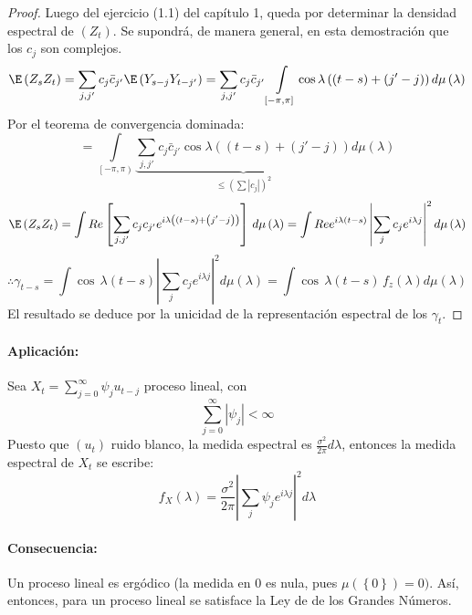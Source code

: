 \begin{proof}
Luego del ejercicio (1.1) del cap\'{i}tulo 1, queda por determinar la densidad espectral de $(Z_{{t}})$. Se supondr\'{a}, de manera general, en esta demostraci\'{o}n que los $c_{j}$ son complejos.
\[
\E\left( {Z_{s} Z_{t} } \right)=\sum_{j,j'} {c_{j} \bar{{c}}_{j'} \E\left( {Y_{s-j} Y_{t-j'} } \right)} =\sum_{j,j'} {c_{j} \bar{{c}}_{j'} } \int\limits_{\left[ {-\pi ,\pi } \right]} {\cos \lambda \left( {\left( {t-s} \right)+\left( {j'-j} \right)} \right)d\mu \left( \lambda \right)} 
\]
Por el teorema de convergencia dominada: 
\[
=\int\limits_{\left[ {-\pi ,\pi } \right)} {\underbrace {\sum_{j,j'} {c_{j} \bar{{c}}_{j'} \cos \lambda \left( {\left( {t-s} \right)+\left( {j'-j} \right)} \right)} }_{\le \left( {\sum {\left| {c_{j} } \right|} } \right)^{2}}} d\mu \left( \lambda \right)
\]
\[
\E\left( {Z_{s} Z_{t} } \right)=\int {Re\left[ {\sum_{j,j'} {c_{j} c_{j'} e^{i\lambda \left( {\left( {t-s} \right)+\left( {j'-j} \right)} \right)}} } \right]\,d\mu \left( \lambda \right)} =\int {Re e^{i\lambda \left( {t-s} \right)}\left| {\sum_j {c_{j} e^{i\lambda j}} } \right|^{2}d\mu \left( \lambda \right)} 
\]
\[
\therefore\gamma_{t-s} =\int {\cos \,\lambda \left( {t-s} \right)} \left| {\sum_j {c_{j} e^{i\lambda j}} } \right|^{2}d\mu \left( \lambda \right)=\int {\cos \,\lambda (t-s)\,f_{z} (\lambda )d\mu (\lambda )} 
\]
El resultado se deduce por la unicidad de la representaci\'{o}n espectral de los $\gamma_{t}$.
\end{proof}

\paragraph{Aplicaci\'{o}n: } Sea $X_{t} =\sum_{j=0}^\infty {\psi_{j } u_{t-j} } $ proceso lineal, con 
\[
\sum_{j=0}^\infty \left| \psi_{j} \right| <\infty 
\]
Puesto que $(u_{t})$ ruido blanco, la medida espectral es $\frac{\sigma^{2}}{2\pi }d\lambda$, entonces la medida espectral de $X_{t}$ se escribe:
\[
f_{X} \left( \lambda \right)=\frac{\sigma^{2}}{2\pi }\left| {\sum_j {\psi_{j} e^{i\lambda j}} } \right|^{2}d\lambda 
\]

\paragraph{Consecuencia: } Un proceso lineal es erg\'{o}dico (la medida en 0 es nula, pues $\mu \left( \left\{ 0 \right\} \right)=0)$. As\'{i}, entonces, para un proceso lineal se satisface la Ley de de los Grandes N\'{u}meros.

